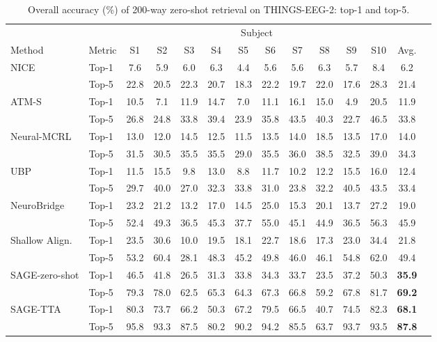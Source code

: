 \documentclass{article}
\begin{document}
\begin{table}[H]
\caption{Overall accuracy (\%) of 200-way zero-shot retrieval on THINGS-EEG-2: top-1 and top-5.}
\label{tab:main}
\centering
\small
\setlength{\tabcolsep}{3.2pt}
\begin{tabular}{@{}llcccccccccccc@{}}
\toprule
 & & \multicolumn{10}{c}{Subject} & \\
\cmidrule(lr){3-12}
Method & Metric & S1 & S2 & S3 & S4 & S5 & S6 & S7 & S8 & S9 & S10 & Avg.\\
\midrule
\addlinespace[2pt]
NICE~\cite{song2024nice} & Top-1 & 7.6 & 5.9 & 6.0 & 6.3 & 4.4 & 5.6 & 5.6 & 6.3 & 5.7 & 8.4 & 6.2 \\
 & Top-5 & 22.8 & 20.5 & 22.3 & 20.7 & 18.3 & 22.2 & 19.7 & 22.0 & 17.6 & 28.3 & 21.4 \\
 \midrule
ATM-S~\cite{li2024atm} & Top-1 & 10.5 & 7.1 & 11.9 & 14.7 & 7.0 & 11.1 & 16.1 & 15.0 & 4.9 & 20.5 & 11.9 \\
 & Top-5 & 26.8 & 24.8 & 33.8 & 39.4 & 23.9 & 35.8 & 43.5 & 40.3 & 22.7 & 46.5 & 33.8 \\
 \midrule
Neural-MCRL~\cite{li2024mcrl} & Top-1 & 13.0 & 12.0 & 14.5 & 12.5 & 11.5 & 13.5 & 14.0 & 18.5 & 13.5 & 17.0 & 14.0 \\
 & Top-5 & 31.5 & 30.5 & 35.5 & 35.5 & 29.0 & 35.5 & 36.0 & 38.5 & 32.5 & 39.0 & 34.3 \\
 \midrule
UBP~\cite{wu2025ubp} & Top-1 & 11.5 & 15.5 & 9.8 & 13.0 & 8.8 & 11.7 & 10.2 & 12.2 & 15.5 & 16.0 & 12.4 \\
 & Top-5 & 29.7 & 40.0 & 27.0 & 32.3 & 33.8 & 31.0 & 23.8 & 32.2 & 40.5 & 43.5 & 33.4 \\
 \midrule
NeuroBridge~\cite{zhang2025neurobridge} & Top-1 & 23.2 & 21.2 & 13.2 & 17.0 & 14.5 & 25.0 & 15.3 & 20.1 & 13.7 & 27.2 & 19.0 \\
 & Top-5 & 52.4 & 49.3 & 36.5 & 45.3 & 37.7 & 55.0 & 45.1 & 44.9 & 36.5 & 56.3 & 45.9 \\
 \midrule
Shallow Align.~\cite{du2025shallow} & Top-1 & 23.5 & 30.6 & 10.0 & 19.5 & 18.1 & 22.7 & 18.6 & 17.3 & 23.0 & 34.4 & 21.8 \\
 & Top-5 & 53.2 & 60.4 & 28.1 & 48.3 & 45.2 & 49.8 & 46.0 & 46.1 & 54.8 & 62.0 & 49.4 \\
 \midrule
SAGE-zero-shot & Top-1 & 46.5 & 41.8 & 26.5 & 31.3 & 33.8 & 34.3 & 33.7 & 23.5 & 37.2 & 50.3 & \textbf{35.9} \\
 & Top-5 & 79.3 & 78.0 & 62.5 & 65.3 & 64.3 & 67.3 & 66.8 & 59.2 & 67.8 & 81.7 & \textbf{69.2} \\
 \addlinespace[2pt]
\hdashline
\addlinespace[2pt]
SAGE-TTA & Top-1 & 80.3 & 73.7 & 66.2 & 50.3 & 67.2 & 79.5 & 66.5 & 40.7 & 74.5 & 82.3 & \textbf{68.1} \\
 & Top-5 & 95.8 & 93.3 & 87.5 & 80.2 & 90.2 & 94.2 & 85.5 & 63.7 & 93.7 & 93.5 & \textbf{87.8} \\
\bottomrule
\end{tabular}
\end{table}
\vspace{-15pt}
\end{document}
